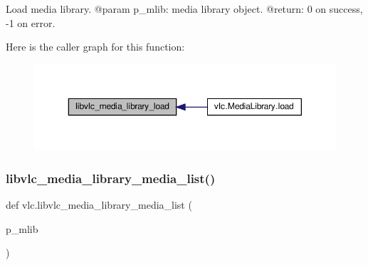 \begin{DoxyVerb}Load media library.
@param p_mlib: media library object.
@return: 0 on success, -1 on error.
\end{DoxyVerb}
 Here is the caller graph for this function\+:
\nopagebreak
\begin{figure}[H]
\begin{center}
\leavevmode
\includegraphics[width=350pt]{namespacevlc_aeaee7cdfd32d61475c51834969d42314_icgraph}
\end{center}
\end{figure}
\mbox{\label{namespacevlc_a0df1f618236bf73ed4b0b4d17ca37a7c}} 
\subsubsection{\texorpdfstring{libvlc\+\_\+media\+\_\+library\+\_\+media\+\_\+list()}{libvlc\_media\_library\_media\_list()}}
{\footnotesize\ttfamily def vlc.\+libvlc\+\_\+media\+\_\+library\+\_\+media\+\_\+list (\begin{DoxyParamCaption}\item[{}]{p\+\_\+mlib }\end{DoxyParamCaption})}

